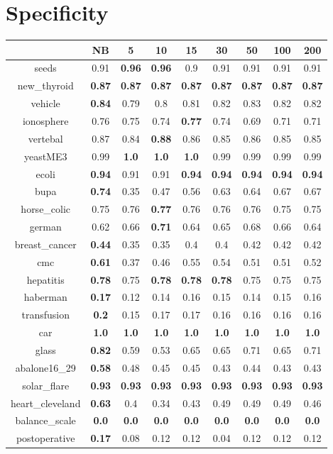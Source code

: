 \documentclass{article}%
\begin{document}
%
\section*{Specificity}%
\begin{tabular}{c|cccccccc}%
\hline%
&NB&5&10&15&30&50&100&200\\%
\hline%
seeds&0.91&\textbf{0.96}&\textbf{0.96}&0.9&0.91&0.91&0.91&0.91\\%
new\_thyroid&\textbf{0.87}&\textbf{0.87}&\textbf{0.87}&\textbf{0.87}&\textbf{0.87}&\textbf{0.87}&\textbf{0.87}&\textbf{0.87}\\%
vehicle&\textbf{0.84}&0.79&0.8&0.81&0.82&0.83&0.82&0.82\\%
ionosphere&0.76&0.75&0.74&\textbf{0.77}&0.74&0.69&0.71&0.71\\%
vertebal&0.87&0.84&\textbf{0.88}&0.86&0.85&0.86&0.85&0.85\\%
yeastME3&0.99&\textbf{1.0}&\textbf{1.0}&\textbf{1.0}&0.99&0.99&0.99&0.99\\%
ecoli&\textbf{0.94}&0.91&0.91&\textbf{0.94}&\textbf{0.94}&\textbf{0.94}&\textbf{0.94}&\textbf{0.94}\\%
bupa&\textbf{0.74}&0.35&0.47&0.56&0.63&0.64&0.67&0.67\\%
horse\_colic&0.75&0.76&\textbf{0.77}&0.76&0.76&0.76&0.75&0.75\\%
german&0.62&0.66&\textbf{0.71}&0.64&0.65&0.68&0.66&0.64\\%
breast\_cancer&\textbf{0.44}&0.35&0.35&0.4&0.4&0.42&0.42&0.42\\%
cmc&\textbf{0.61}&0.37&0.46&0.55&0.54&0.51&0.51&0.52\\%
hepatitis&\textbf{0.78}&0.75&\textbf{0.78}&\textbf{0.78}&\textbf{0.78}&0.75&0.75&0.75\\%
haberman&\textbf{0.17}&0.12&0.14&0.16&0.15&0.14&0.15&0.16\\%
transfusion&\textbf{0.2}&0.15&0.17&0.17&0.16&0.16&0.16&0.16\\%
car&\textbf{1.0}&\textbf{1.0}&\textbf{1.0}&\textbf{1.0}&\textbf{1.0}&\textbf{1.0}&\textbf{1.0}&\textbf{1.0}\\%
glass&\textbf{0.82}&0.59&0.53&0.65&0.65&0.71&0.65&0.71\\%
abalone16\_29&\textbf{0.58}&0.48&0.45&0.45&0.43&0.44&0.43&0.43\\%
solar\_flare&\textbf{0.93}&\textbf{0.93}&\textbf{0.93}&\textbf{0.93}&\textbf{0.93}&\textbf{0.93}&\textbf{0.93}&\textbf{0.93}\\%
heart\_cleveland&\textbf{0.63}&0.4&0.34&0.43&0.49&0.49&0.49&0.46\\%
balance\_scale&\textbf{0.0}&\textbf{0.0}&\textbf{0.0}&\textbf{0.0}&\textbf{0.0}&\textbf{0.0}&\textbf{0.0}&\textbf{0.0}\\%
postoperative&\textbf{0.17}&0.08&0.12&0.12&0.04&0.12&0.12&0.12\\%
\end{tabular}
\end{document}

